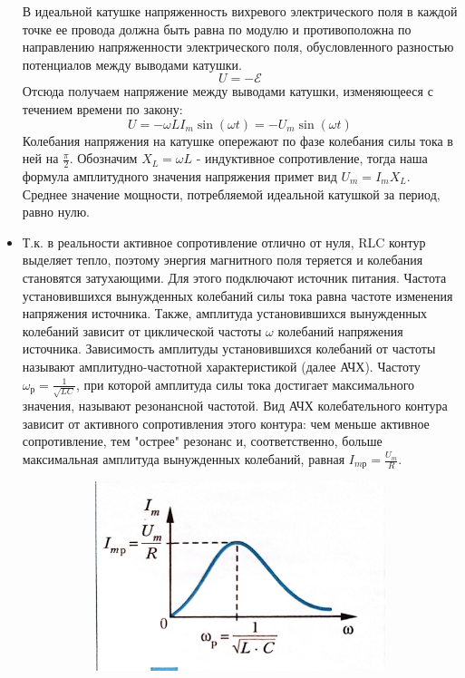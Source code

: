 \documentclass{article}
\begin{document}
\begin{flushleft}
\begin{itemize}
        В идеальной катушке напряженность вихревого электрического поля в каждой точке ее провода должна быть равна по модулю и противоположна по направлению напряженности электрического поля, обусловленного разностью потенциалов между выводами катушки. \[U = -\mathcal{E}\]
        Отсюда получаем напряжение между выводами катушки, изменяющееся с течением времени по закону: \[U = -\omega LI_m \sin(\omega t) = -U_m \sin(\omega t)\]
        Колебания напряжения на катушке опережают по фазе колебания силы тока в ней на $\frac{\pi}{2}$. Обозначим $X_L = \omega L$ - индуктивное сопротивление, тогда наша формула амплитудного значения напряжения примет вид $U_m = I_m X_L$.
        \\ Среднее значение мощности, потребляемой идеальной катушкой за период, равно нулю.
        \item Т.к. в реальности активное сопротивление отлично от нуля, RLC контур выделяет тепло, поэтому энергия магнитного поля теряется и колебания становятся затухающими. Для этого подключают источник питания. Частота установившихся вынужденных колебаний силы тока равна частоте изменения напряжения источника. Также, амплитуда установившихся вынужденных колебаний зависит от циклической частоты $\omega$ колебаний напряжения источника. Зависимость амплитуды установившихся колебаний от частоты называют амплитудно-частотной характеристикой (далее АЧХ). Частоту $\omega_\text{р} = \frac{1}{\sqrt{LC}}$, при которой амплитуда силы тока достигает максимального значения, называют резонансной частотой. Вид АЧХ колебательного контура зависит от активного сопротивления этого контура: чем меньше активное сопротивление, тем "острее" резонанс и, соответственно, больше максимальная амплитуда вынужденных колебаний, равная $I_{m \text{р}} = \frac{U_m}{R}$. 
        \begin{figure}[h]
            \centering
            \begin{subfigure}
                \centering
                \includegraphics[width=.4\linewidth]{images/photo_2024-12-11_23-24-12.jpg}
                \label{fig:sub1}
            \end{subfigure}
            \begin{subfigure}

\end{subfigure}
\end{figure}
\end{itemize}
\end{flushleft}
\end{document}
